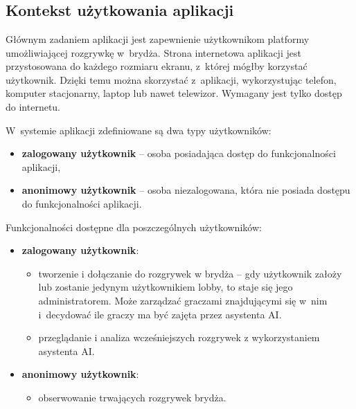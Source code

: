 \chapter{\ChapterTitleScope}
\label{sec:zakres-funkcjonalnosci}


\section{Kontekst użytkowania aplikacji}

Głównym zadaniem aplikacji jest zapewnienie użytkownikom platformy
umożliwiającej rozgrywkę w~brydża. Strona internetowa aplikacji jest
przystosowana do każdego rozmiaru ekranu, z~której mógłby korzystać
użytkownik. Dzięki temu można skorzystać z~aplikacji, wykorzystując
telefon, komputer stacjonarny, laptop lub nawet telewizor. Wymagany
jest tylko dostęp do internetu.

W~systemie aplikacji zdefiniowane są dwa typy użytkowników:
\begin{itemize}
  \item \textbf{zalogowany użytkownik} -- osoba posiadająca dostęp do
        funkcjonalności aplikacji,

  \item \textbf{anonimowy użytkownik} -- osoba niezalogowana, która nie
        posiada dostępu do
        funkcjonalności aplikacji.
\end{itemize}

Funkcjonalności dostępne dla poszczególnych użytkowników:
\begin{itemize}
  \item \textbf{zalogowany użytkownik}:
        \begin{itemize}
          \item tworzenie i dołączanie do rozgrywek w brydża --
                gdy użytkownik założy lub zostanie jedynym
                użytkownikiem lobby, to staje się jego
                administratorem.
                Może zarządzać graczami znajdującymi się w~nim
                i~decydować ile graczy ma być zajęta przez asystenta AI.
          \item przeglądanie i analiza wcześniejszych rozgrywek
                z wykorzystaniem asystenta AI.
        \end{itemize}

  \item \textbf{anonimowy użytkownik}:
        \begin{itemize}
          \item obserwowanie trwających rozgrywek brydża.
        \end{itemize}
\end{itemize}

